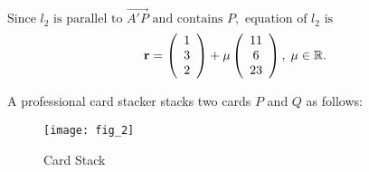 \documentclass[12pt, a4 paper]{article}
\begin{document}
\begin{outline}[enumerate]
					${\textrm{Since }}{l_2}{\textrm{ is parallel to }}\overrightarrow {A'P} {\textrm{ and contains }}P,{\textrm{ equation of }}{l_2}{\textrm{ is}}$
					\begin{align*}
						{\bf{r}} = \left( {\begin{array}{*{20}{c}}1 \\3\\2\end{array}} \right) + \mu \left( {\begin{array}{*{20}{c}}{11}\\6\\{23}\end{array}} \right),\;\mu  \in \mathbb{R}.
					\end{align*}


					\color{black}
					\newpage
					\1 A professional card stacker stacks two cards $P$ and $Q$ as follows:
					\begin{figure}[h]
						\centering
						\texttt{[image: fig\_2]}
						\caption{Card Stack}
					\end{figure}


\end{outline}
\end{document}
